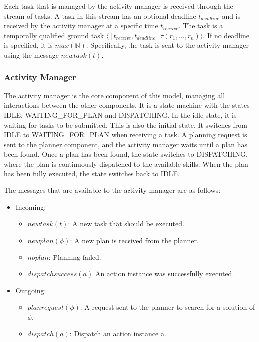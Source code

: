 Each task that is managed by the activity manager is received through the stream of tasks.
A task in this stream has an optional deadline $t_{deadline}$ and is received by the activity manager at a specific time $t_{receive}$.
The task is a temporally qualified ground task $\langle[t_{receive},t_{deadline}] \tau(r_1,\dots,r_n)\rangle$.
If no deadline is specified, it is $max(\mathbb{N})$.
Specifically, the task is sent to the activity manager using the message $newtask(t)$.

\subsubsection{Activity Manager}

The activity manager is the core component of this model, managing all interactions between the other components.
It is a state machine with the states IDLE, \mbox{WAITING\_FOR\_PLAN} and DISPATCHING.
In the idle state, it is waiting for tasks to be submitted.
This is also the initial state.
It switches from IDLE to WAITING\_FOR\_PLAN when receiving a task.
A planning request is sent to the planner component, and the activity manager waits until a plan has been found.
Once a plan has been found, the state switches to DISPATCHING, where the plan is continuously dispatched to the available skills.
When the plan has been fully executed, the state switches back to IDLE.

The messages that are available to the activity manager are as follows:
\begin{itemize}
    \item Incoming:
    \begin{itemize}
        \item $newtask(t)$: A new task that should be executed. 
        \item $newplan(\phi)$: A new plan is received from the planner.
        \item $noplan$: Planning failed.
        \item $dispatchsuccess(a)$ An action instance was successfully executed.
    \end{itemize}
    \item Outgoing:
    \begin{itemize}
        \item $planrequest(\phi)$: A request sent to the planner to search for a solution of $\phi$.
        \item $dispatch(a)$: Dispatch an action instance a.
    \end{itemize}
\end{itemize}


